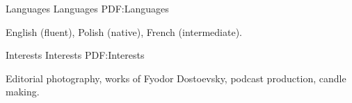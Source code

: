 \documentclass[letterpaper,MMMyyyy,nonstopmode]{simpleresumecv}
\begin{document}
\begin{Body}

\noindent\hrulefill
\Section
{Languages}
{Languages}
{PDF:Languages}

English (fluent), Polish (native), French (intermediate).


\Section
{Interests}
{Interests}
{PDF:Interests}

Editorial photography, works of Fyodor Dostoevsky, podcast production, candle making.



\end{Body}


\BigGap
\UseNoteFont%
\null\hfill%
\end{document}

